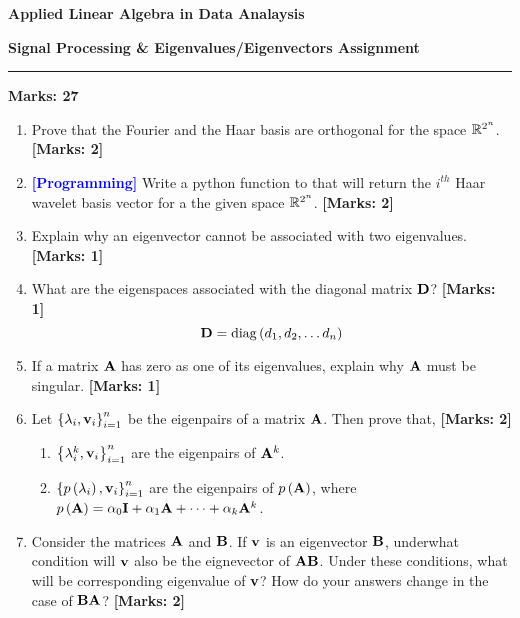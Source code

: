 \documentclass[12pt]{article}
\def\mf{\ensuremath\mathbf}
\def\mb{\ensuremath\mathbb}
\def\lp{\ensuremath\left(}
\def\rp{\ensuremath\right)}
\def\lc{\ensuremath\left\{}
\def\rc{\ensuremath\right\}}
\begin{document}
\begin{center}
\begin{large}
\textbf{Applied Linear Algebra in Data Analaysis}\\
\vspace{0.1cm}
\end{large}
\textbf{Signal Processing \& Eigenvalues/Eigenvectors Assignment}
\end{center}
\hrule
\vspace{1em}

\begin{large}
    \textbf{Marks: 27}
\end{large}

\begin{enumerate}
    \item Prove that the Fourier and the Haar basis are orthogonal for the space $\mb{R}^{2^{n}}$.\textbf{[Marks: 2]}
     
    \item \textcolor{blue}{\textbf{[Programming]}} Write a python function to that will return the $i^{th}$ Haar wavelet basis vector for a the given space $\mb{R}^{2^n}$. \textbf{[Marks: 2]}
    
    \item Explain why an eigenvector cannot be associated with two eigenvalues. \textbf{[Marks: 1]}

    \item What are the eigenspaces associated with the diagonal matrix $\mf{D}$? \textbf{[Marks: 1]}
    \[ \mf{D} = \mathrm{diag}\lp d_1, d_2, \ldots d_n\rp \]

    \item If a matrix $\mf{A}$ has zero as one of its eigenvalues, explain why $\mf{A}$ must be singular. \textbf{[Marks: 1]}

    \item Let $\lc\lambda_i, \mf{v}_i\rc_{i=1}^n$ be the eigenpairs of a matrix $\mf{A}$. Then prove that, \textbf{[Marks: 2]}
    \begin{enumerate}
        \item $\lc\lambda_i^k, \mf{v}_i\rc_{i=1}^n$ are the eigenpairs of $\mf{A}^k$. 
        \item $\lc p\lp\lambda_i\rp, \mf{v}_i\rc_{i=1}^n$ are the eigenpairs of $p\lp\mf{A}\rp$, where $p\lp \mf{A}\rp = \alpha_0\mf{I} + \alpha_1\mf{A} + \cdots + \alpha_k\mf{A}^k$.
    \end{enumerate}

    \item Consider the matrices $\mf{A}$ and $\mf{B}$. If $\mf{v}$ is an eigenvector $\mf{B}$, underwhat condition will $\mf{v}$ also be the eignevector of $\mf{A}\mf{B}$. Under these conditions, what will be corresponding eigenvalue of $\mf{v}$? How do your answers change in the case of $\mf{BA}$? \textbf{[Marks: 2]}


\end{enumerate}
\end{document}
